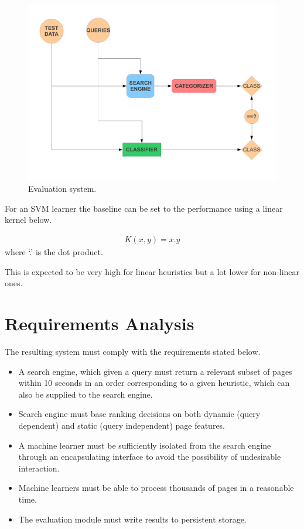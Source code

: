 \documentclass[12pt,twoside,notitlepage]{report}
\begin{document}
\begin{figure}[h]
\centering
\includegraphics[scale=0.5]{figs/eval.pdf}
\caption{Evaluation system. }
\label{eval}
\end{figure}
For an SVM learner the baseline can be set to the performance using a linear
kernel below.

\begin{gather}
K(x,y) = x . y
\end{gather}
where `.' is the dot product.

This is expected to be very high for linear heuristics but a lot lower for
non-linear ones.

\section{Requirements Analysis}
The resulting system must comply with the requirements stated below. 
\begin{itemize}
  \item{A search engine, which given a query must return a relevant subset of
      pages within 10 seconds in an order corresponding to a given heuristic, which can also be
  supplied to the search engine.}
  \item{Search engine must base ranking decisions on both dynamic
      (query dependent) and static (query independent)
    page features.}
  \item{A machine learner must be sufficiently isolated from the search engine
    through an encapsulating interface to avoid the possibility of undesirable interaction.}
  \item{Machine learners must be able to process thousands of pages in a
    reasonable time.}
  \item{The evaluation module must write results to persistent storage.}
\end{itemize}
\end{document}

